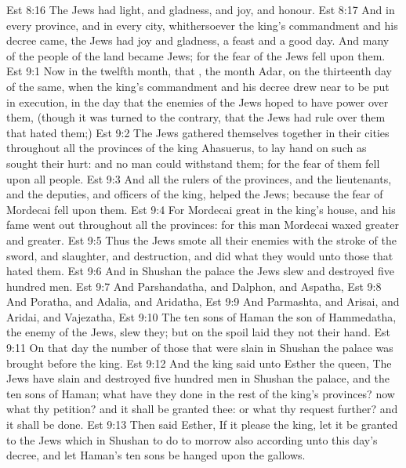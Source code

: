 \vs Est 8:16 The Jews had light, and gladness, and joy, and honour.
\vs Est 8:17 And in every province, and in every city, whithersoever the king's commandment and his decree came, the Jews had joy and gladness, a feast and a good day. And many of the people of the land became Jews; for the fear of the Jews fell upon them.
\vs Est 9:1 Now in the twelfth month, that , the month Adar, on the thirteenth day of the same, when the king's commandment and his decree drew near to be put in execution, in the day that the enemies of the Jews hoped to have power over them, (though it was turned to the contrary, that the Jews had rule over them that hated them;)
\vs Est 9:2 The Jews gathered themselves together in their cities throughout all the provinces of the king Ahasuerus, to lay hand on such as sought their hurt: and no man could withstand them; for the fear of them fell upon all people.
\vs Est 9:3 And all the rulers of the provinces, and the lieutenants, and the deputies, and officers of the king, helped the Jews; because the fear of Mordecai fell upon them.
\vs Est 9:4 For Mordecai  great in the king's house, and his fame went out throughout all the provinces: for this man Mordecai waxed greater and greater.
\vs Est 9:5 Thus the Jews smote all their enemies with the stroke of the sword, and slaughter, and destruction, and did what they would unto those that hated them.
\vs Est 9:6 And in Shushan the palace the Jews slew and destroyed five hundred men.
\vs Est 9:7 And Parshandatha, and Dalphon, and Aspatha,
\vs Est 9:8 And Poratha, and Adalia, and Aridatha,
\vs Est 9:9 And Parmashta, and Arisai, and Aridai, and Vajezatha,
\vs Est 9:10 The ten sons of Haman the son of Hammedatha, the enemy of the Jews, slew they; but on the spoil laid they not their hand.
\vs Est 9:11 On that day the number of those that were slain in Shushan the palace was brought before the king.
\vs Est 9:12 And the king said unto Esther the queen, The Jews have slain and destroyed five hundred men in Shushan the palace, and the ten sons of Haman; what have they done in the rest of the king's provinces? now what  thy petition? and it shall be granted thee: or what  thy request further? and it shall be done.
\vs Est 9:13 Then said Esther, If it please the king, let it be granted to the Jews which  in Shushan to do to morrow also according unto this day's decree, and let Haman's ten sons be hanged upon the gallows.
